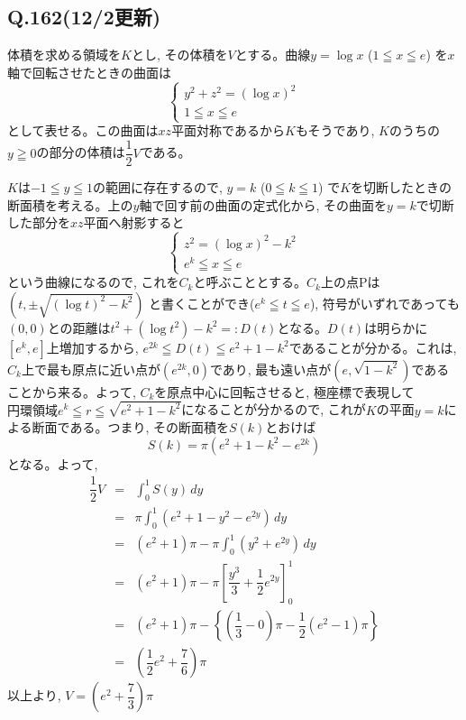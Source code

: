 \documentclass[twocolumn]{jbook}
\newcommand{\bolm}[1]{{\mbox{\boldmath $#1$}}}
\newcommand{\disp}{\displaystyle}
\newcommand{\beqn}{\begin{eqnarray*}}
\newcommand{\eeqn}{\end{eqnarray*}}
\newcommand{\bcas}{\begin{cases}}
\newcommand{\ecas}{\end{cases}}
\newcommand{\mr}{\mathrm}
\renewcommand{\leq}{\leqq}
\renewcommand{\geq}{\geqq}
\begin{document}
\subsection*{Q.162(12/2更新)}
体積を求める領域を$K$とし, その体積を$V$とする。曲線$y=\log{x}$ ($1\leq x \leq e$) を$x$軸で回転させたときの曲面は
\[\bcas
y^2+z^2 = (\log{x})^2\\
1\leq x\leq e
\ecas\]
として表せる。この曲面は$xz$平面対称であるから$K$もそうであり, $K$のうちの$y\geq 0$の部分の体積は$\dfrac{1}{2}V$である。\par
$K$は$-1\leq y\leq 1$の範囲に存在するので, $y=k$ ($0\leq k\leq 1$) で$K$を切断したときの断面積を考える。上の$y$軸で回す前の曲面の定式化から, その曲面を$y=k$で切断した部分を$xz$平面へ射影すると
\[
\bcas
z^2 = (\log{x})^2 - k^2\\
e^{k} \leq x\leq e 
\ecas
\]
という曲線になるので, これを$C_k$と呼ぶこととする。$C_k$上の点$\mr{P}$は$(t,\pm\sqrt{(\log{t})^2 - k^2})$ と書くことができ($e^{k} \leq t\leq e$), 符号がいずれであっても$(0,0)$との距離は$t^2+(\log{t}^2) - k^2=:D(t)$となる。$D(t)$は明らかに$[e^{k}, e]$上増加するから, $ e^{2k} \leq D(t) \leq e^2+1-k^2$であることが分かる。これは, $C_k$上で最も原点に近い点が$(e^{2k}, 0)$であり, 最も遠い点が$(e,\sqrt{1-k^2})$であることから来る。よって, $C_k$を原点中心に回転させると, 極座標で表現して\bolm{円環領域 e^{k} \leq r \leq \sqrt{e^2+1-k^2}}になることが分かるので, これが$K$の平面$y=k$による断面である。つまり, その断面積を$S(k)$とおけば
\[S(k) = \pi(e^2+1-k^2 - e^{2k})\]
となる。よって, 
\beqn
\dfrac{1}{2}V &=& \disp\int_{0}^{1} S(y) \, dy \\
&=& \pi\disp\int_{0}^{1}(e^2+1-y^2 - e^{2y})\, dy\\
&=& (e^2+1)\pi - \pi\disp\int_{0}^{1} (y^2 + e^{2y})\, dy\\
&=& (e^2+1)\pi - \pi\left[ \dfrac{y^3}{3} + \dfrac{1}{2} e^{2y} \right]_{0}^{1}\\
&=& (e^2+1)\pi - \left\{\left(\dfrac{1}{3} - 0\right)\pi - \dfrac{1}{2}\left(e^2 - 1\right)\pi\right\}\\
&=& \left( \dfrac{1}{2}e^2 + \dfrac{7}{6} \right)\pi
\eeqn
以上より, \bolm{V=\left(e^2+\dfrac{7}{3}\right)\pi}




\clearpage
\end{document}
